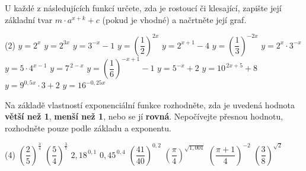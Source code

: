 \documentclass[12pt,a4paper]{article}
\begin{document}

\exercisepart
\setcounter{section}{1}

\begin{exercise}
U každé z následujících funkcí určete, zda je rostoucí či klesající,
zapište její základní tvar $m\cdot a^{x+k}+c$ (pokud je vhodné)
a načrtněte její graf.

\begin{tasks}(2)
    \task $y = 2^{x}$
    \task $y = 2^{3x}$
    \task $y = 3^{-x} - 1$
    \task $y = \left(\dfrac12\right)^{2x}$
    \task $y = 2^{x+1} - 4$
    \task $y = \left(\dfrac13\right)^{-2x}$
    \task $y = 2^{x}\cdot 3^{-x}$
    \task $y = 5 \cdot 4^{x-1}$
    \task $y = 7^{\,2-x}$
    \task $y = \left(\dfrac{1}{6}\right)^{-x+1} - 1$
    \task $y = 5^{-x} + 2$
    \task $y = 10^{\,2x + 5} + 8$
    \task $y = 9^{0{,}5x}\cdot 3 + 2$
    \task $y = 16^{-0{,}25x}$
\end{tasks}
\end{exercise}


\begin{exercise}
Na základě vlastností exponenciální funkce rozhodněte,
zda je uvedená hodnota \textbf{větší než 1}, \textbf{menší než 1},
nebo se jí \textbf{rovná}.
Nepočívejte přesnou hodnotu, rozhodněte pouze podle základu a exponentu.

\begin{tasks}(4)
    \task $\left(\dfrac{2}{5}\right)^{\frac34}$
    \task $\left(\dfrac{5}{4}\right)^{\frac37}$
    \task $2{,}18^{\,0{,}1}$
    \task $0{,}45^{\,0{,}4}$
    \task $\left(\dfrac{41}{40}\right)^{0{,}2}$
    \task $\left(\dfrac{\pi}{4}\right)^{\sqrt{1{,}001}}$
    \task $\left(\dfrac{\pi + 1}{4}\right)^{-2}$
    \task $\left(\dfrac{3}{8}\right)^{\sqrt{2}}$
\end{tasks}
\end{exercise}
\end{document}
